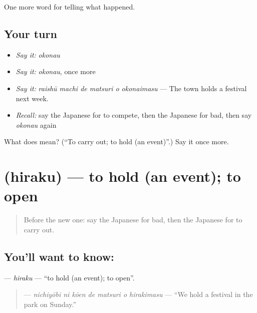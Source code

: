 \begin{grammarlens}[title={What you've built}]
One more word for telling what happened.
\end{grammarlens}

\subsection*{Your turn}
\begin{itemize}
\raggedright
  \item \emph{Say it:} \emph{okonau}
  \item \emph{Say it:} \emph{okonau}, once more
  \item \emph{Say it:} \emph{raishū machi de matsuri o okonaimasu} — The town holds a festival next week.
  \item \emph{Recall:} say the Japanese for to compete, then the Japanese for bad, then say \emph{okonau} again
\end{itemize}

\begin{tcolorbox}[breakable,colback=teal!4,colframe=teal!35!black,title={Before you move on}]
What does  mean? (\textquotedblleft{}To carry out; to hold (an event)\textquotedblright{}.) Say it once more.
\end{tcolorbox}
\section[\texorpdfstring{\ja{ひらく} (hiraku)}{ひらく (hiraku)}]{ (hiraku) — to hold (an event); to open}

\label{lesson:JA-C285-hiraku}



\begin{quote}
Before the new one: say the Japanese for bad, then the Japanese for to carry out.
\end{quote}

\subsection*{You'll want to know: }
\textbf{} — \emph{hiraku} — \textquotedblleft{}to hold (an event); to open\textquotedblright{}.

\begin{quote}
\textbf{   } — \emph{nichiyōbi ni kōen de matsuri o hirakimasu} — \textquotedblleft{}We hold a festival in the park on Sunday.\textquotedblright{}
\end{quote}

